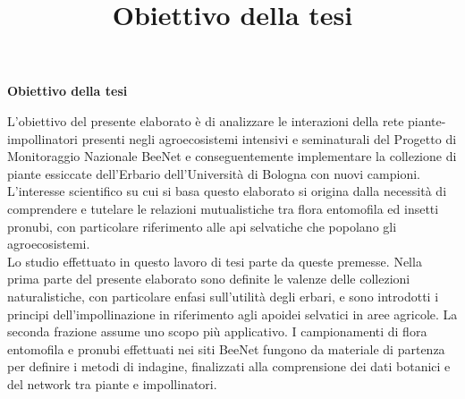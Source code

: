 \documentclass[main.tex]{subfiles}
\begin{document}
\title{Obiettivo della tesi}

\begin{Large}\textbf{Obiettivo della tesi}\end{Large}
\vspace{5mm}

L’obiettivo del presente elaborato è di analizzare le interazioni della rete piante-impollinatori presenti negli agroecosistemi intensivi e seminaturali del Progetto di Monitoraggio Nazionale BeeNet e conseguentemente implementare la collezione di piante essiccate dell’Erbario dell'Università di Bologna con nuovi campioni. \\
L’interesse scientifico su cui si basa questo elaborato si origina dalla necessità di comprendere e tutelare le relazioni mutualistiche tra flora entomofila ed insetti pronubi, con particolare riferimento alle api selvatiche che popolano gli agroecosistemi. \\
Lo studio effettuato in questo lavoro di tesi parte da queste premesse. Nella prima parte del presente elaborato sono definite le valenze delle collezioni naturalistiche, con particolare enfasi sull’utilità degli erbari, e sono introdotti i principi dell’impollinazione in riferimento agli apoidei selvatici in aree agricole. La seconda frazione assume uno scopo più applicativo. I campionamenti di flora entomofila e pronubi effettuati nei siti BeeNet fungono da materiale di partenza per definire i metodi di indagine, finalizzati alla comprensione dei dati botanici e del network tra piante e impollinatori.

\setcounter{page}{1}
\clearpage
\end{document}
